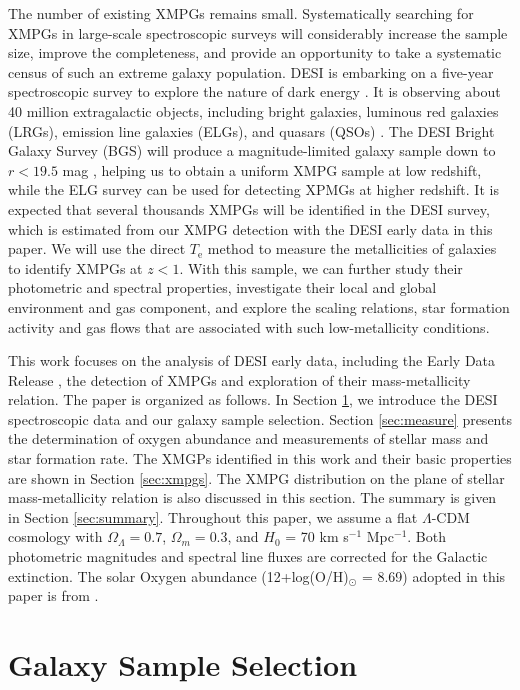 \documentclass[twocolumn]{aastex631}
\newcommand{\boldtext}[1]{\textcolor[rgb]{0,0,0}{#1}}
\begin{document}
The number of existing XMPGs remains small. Systematically searching for XMPGs in large-scale spectroscopic surveys will considerably increase the sample size, improve the completeness, and provide an opportunity to take a systematic census of such an extreme galaxy population. DESI is embarking on a five-year spectroscopic survey to explore the nature of dark energy \citep{Lev13,Des16a,Des16b}. It is observing about 40 million extragalactic objects, including bright galaxies, luminous red galaxies (LRGs), emission line galaxies (ELGs), and quasars (QSOs) \citep{Des16a,Sch23,Mye23}. The DESI Bright Galaxy Survey (BGS) will produce a magnitude-limited galaxy sample down to $r<19.5$ mag \citep{Hah23}, helping us to obtain a uniform XMPG sample at low redshift, while the ELG survey \citep{Rai23b} can be used for detecting XPMGs at higher redshift. It is expected that several thousands XMPGs will be identified in the DESI survey, \boldtext{which is estimated from our XMPG detection with the DESI early data in this paper.} We will use the direct $T_\mathrm{e}$ method to measure the metallicities of galaxies to identify XMPGs at $z<1$. With this sample, we can further study their photometric and spectral properties, investigate their local and global environment and gas component, and explore the scaling relations, star formation activity and gas flows that are associated with such low-metallicity conditions. 

This work focuses on the analysis of DESI early data, including the Early Data Release \citep[EDR;][]{Des23b}, the detection of XMPGs and exploration of their mass-metallicity relation. The paper is organized as follows. In Section \ref{sec:data}, we introduce the DESI spectroscopic data and our galaxy sample selection. Section \ref{sec:measure} presents the determination of oxygen abundance and measurements of stellar mass and star formation rate. The XMGPs identified in this work and their basic properties are shown in Section \ref{sec:xmpgs}. The XMPG distribution on the plane of stellar mass-metallicity relation is also discussed in this section. The summary is given in Section \ref{sec:summary}. Throughout this paper, we assume a flat $\Lambda$-CDM cosmology with $\Omega_\Lambda =0.7$, $\Omega_m=0.3$, and $H_0$ = 70 km s$^{-1}$ Mpc$^{-1}$. Both photometric magnitudes and spectral line fluxes are corrected for the Galactic extinction. The solar Oxygen abundance (12+log(O/H)$_\odot$ = 8.69) adopted in this paper is from \citet{Asp21}.  

\section{Galaxy Sample Selection} \label{sec:data}
\end{document}
